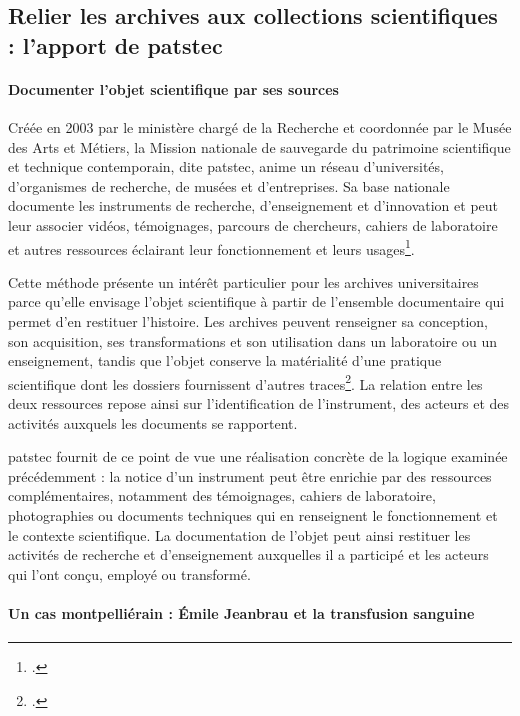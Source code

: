 
\subsection{Relier les archives aux collections scientifiques : l'apport de \gls{patstec}}

\paragraph{Documenter l'objet scientifique par ses sources}

Créée en 2003 par le ministère chargé de la Recherche et coordonnée par le Musée des Arts et Métiers, la Mission nationale de sauvegarde du patrimoine scientifique et technique contemporain, dite \gls{patstec}, anime un réseau d'universités, d'organismes de recherche, de musées et d'entreprises. Sa base nationale documente les instruments de recherche, d'enseignement et d'innovation et peut leur associer vidéos, témoignages, parcours de chercheurs, cahiers de laboratoire et autres ressources éclairant leur fonctionnement et leurs usages\footcite{PATSTECMission}.

Cette méthode présente un intérêt particulier pour les archives universitaires parce qu'elle envisage l'objet scientifique à partir de l'ensemble documentaire qui permet d'en restituer l'histoire. Les archives peuvent renseigner sa conception, son acquisition, ses transformations et son utilisation dans un laboratoire ou un enseignement, tandis que l'objet conserve la matérialité d'une pratique scientifique dont les dossiers fournissent d'autres traces\footcite{Joyaux2018}. La relation entre les deux ressources repose ainsi sur l'identification de l'instrument, des acteurs et des activités auxquels les documents se rapportent.

\gls{patstec} fournit de ce point de vue une réalisation concrète de la logique examinée précédemment : la notice d'un instrument peut être enrichie par des ressources complémentaires, notamment des témoignages, cahiers de laboratoire, photographies ou documents techniques qui en renseignent le fonctionnement et le contexte scientifique. La documentation de l'objet peut ainsi restituer les activités de recherche et d'enseignement auxquelles il a participé et les acteurs qui l'ont conçu, employé ou transformé.

\paragraph{Un cas montpelliérain : Émile Jeanbrau et la transfusion sanguine}

